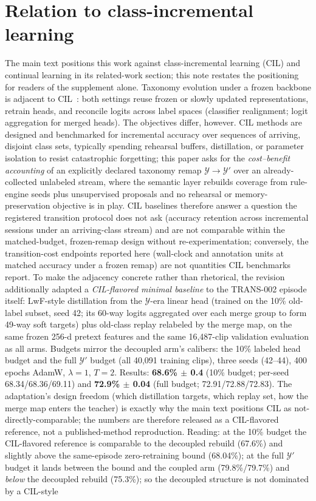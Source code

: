 \documentclass[11pt,a4paper]{article}
\begin{document}
\section{Relation to class-incremental learning}\label{app:cil}

The main text positions this work against class-incremental learning (CIL) and continual learning in its related-work section; this note restates the positioning for readers of the supplement alone. Taxonomy evolution under a frozen backbone is adjacent to CIL~\citep{rebuffi2017icarl,wang2024continual,masana2023cil}: both settings reuse frozen or slowly updated representations, retrain heads, and reconcile logits across label spaces (classifier realignment; logit aggregation for merged heads). The objectives differ, however. CIL methods are designed and benchmarked for incremental accuracy over sequences of arriving, disjoint class sets, typically spending rehearsal buffers, distillation, or parameter isolation to resist catastrophic forgetting; this paper asks for the \emph{cost--benefit accounting} of an explicitly declared taxonomy remap $\mathcal{Y}\to\mathcal{Y}'$ over an already-collected unlabeled stream, where the semantic layer rebuilds coverage from rule-engine seeds plus unsupervised proposals and no rehearsal or memory-preservation objective is in play. CIL baselines therefore answer a question the registered transition protocol does not ask (accuracy retention across incremental sessions under an arriving-class stream) and are not comparable within the matched-budget, frozen-remap design without re-experimentation; conversely, the transition-cost endpoints reported here (wall-clock and annotation units at matched accuracy under a frozen remap) are not quantities CIL benchmarks report. To make the adjacency concrete rather than rhetorical, the revision additionally adapted a \emph{CIL-flavored minimal baseline} to the TRANS-002 episode itself: LwF-style distillation from the $\mathcal{Y}$-era linear head (trained on the 10\% old-label subset, seed 42; its 60-way logits aggregated over each merge group to form 49-way soft targets) plus old-class replay relabeled by the merge map, on the same frozen 256-d pretext features and the same 16,487-clip validation evaluation as all arms. Budgets mirror the decoupled arm's calibers: the 10\% labeled head budget and the full $\mathcal{Y}'$ budget (all 40,091 training clips), three seeds (42--44), 400 epochs AdamW, $\lambda{=}1$, $T{=}2$. Results: \textbf{68.6\% $\pm$ 0.4} (10\% budget; per-seed 68.34/68.36/69.11) and \textbf{72.9\% $\pm$ 0.04} (full budget; 72.91/72.88/72.83). The adaptation's design freedom (which distillation targets, which replay set, how the merge map enters the teacher) is exactly why the main text positions CIL as not-directly-comparable; the numbers are therefore released as a CIL-flavored reference, not a published-method reproduction. Reading: at the 10\% budget the CIL-flavored reference is comparable to the decoupled rebuild (67.6\%) and slightly above the same-episode zero-retraining bound (68.04\%); at the full $\mathcal{Y}'$ budget it lands between the bound and the coupled arm (79.8\%/79.7\%) and \emph{below} the decoupled rebuild (75.3\%); so the decoupled structure is not dominated by a CIL-style 
\end{document}
